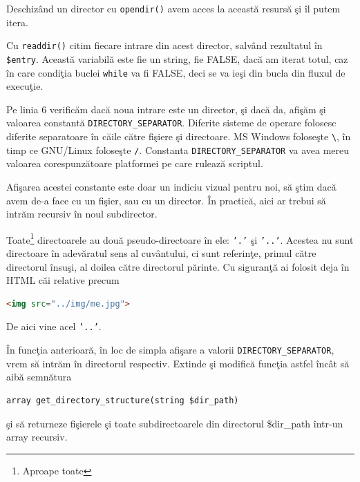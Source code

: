 Deschizând un director cu \texttt{opendir()} avem
acces la această resursă şi îl putem itera.

Cu \texttt{readdir()} citim fiecare intrare din acest
director, salvând rezultatul în \texttt{\$entry}.
Această variabilă este fie un string, fie FALSE,
dacă am iterat totul, caz în care condiţia buclei
\texttt{while} va fi FALSE, deci se va ieşi din
bucla din fluxul de execuţie.

Pe linia 6 verificăm dacă noua intrare este un
director, şi dacă da, afişăm şi valoarea
constantă \texttt{DIRECTORY\_SEPARATOR}.
Diferite sisteme de operare folosesc diferite
separatoare în căile către fişiere şi directoare.
MS Windows foloseşte \texttt{\textbackslash}, în timp ce GNU/Linux
foloseşte \texttt{/}. Constanta \texttt{DIRECTORY\_SEPARATOR}
va avea mereu valoarea corespunzătoare platformei
pe care rulează scriptul.

Afişarea acestei
constante este doar un indiciu vizual pentru noi,
să ştim dacă avem de-a face cu un fişier, sau cu un
director. În practică, aici ar trebui să
intrăm recursiv în noul subdirector.

Toate\footnote{Aproape toate} directoarele
au două pseudo-directoare în ele: \texttt{'.'}
şi \texttt{'..'}. Acestea nu sunt directoare
în adevăratul sens al cuvântului, ci sunt referinţe,
primul către directorul însuşi, al doilea către
directorul părinte. Cu siguranţă ai folosit
deja în HTML căi relative precum
\begin{lstlisting}[language=HTML]
<img src="../img/me.jpg">
\end{lstlisting}
De aici vine acel \texttt{'..'}.

\begin{Exercise}[title={Determinarea recursivă a conţinutului unui director},difficulty=2]
În funcţia anterioară, în loc de simpla afişare
a valorii \texttt{DIRECTORY\_SEPARATOR}, vrem să intrăm în
directorul respectiv. Extinde şi modifică funcţia
astfel încât să aibă semnătura
\begin{verbatim}
array get_directory_structure(string $dir_path)
\end{verbatim}
şi să returneze fişierele şi toate subdirectoarele din
directorul \$dir\_path într-un array recursiv.
\end{Exercise}

